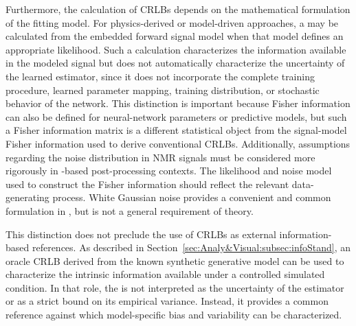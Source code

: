 Furthermore, the calculation of CRLBs depends on the mathematical formulation of the fitting model. For physics-derived or model-driven \DL approaches, a \CRLB may be calculated from the embedded forward signal model when that model defines an appropriate likelihood. Such a calculation characterizes the information available in the modeled signal but does not automatically characterize the uncertainty of the learned estimator, since it does not incorporate the complete training procedure, learned parameter mapping, training distribution, or stochastic behavior of the network. This distinction is important because Fisher information can also be defined for neural-network parameters or predictive models, but such a Fisher information matrix is a different statistical object from the signal-model Fisher information used to derive conventional \MRS CRLBs. Additionally, assumptions regarding the noise distribution in NMR signals must be considered more rigorously in \DL-based post-processing contexts. The likelihood and noise model used to construct the Fisher information should reflect the relevant data-generating process. White Gaussian noise provides a convenient and common formulation in \MRS, but is not a general requirement of \CRLB theory.

This distinction does not preclude the use of CRLBs as external information-based references. As described in Section~\ref{sec:Analy&Visual:subsec:infoStand}, an oracle CRLB derived from the known synthetic generative model can be used to characterize the intrinsic information available under a controlled simulated condition. In that role, the \CRLB is not interpreted as the uncertainty of the \DL estimator or as a strict bound on its empirical variance. Instead, it provides a common reference against which model-specific bias and variability can be characterized.

